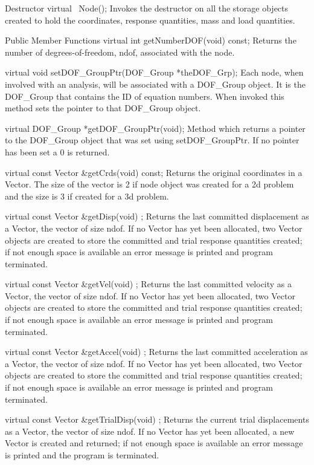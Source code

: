   Destructor  
  virtual ~Node(); 
Invokes the destructor on all the storage objects created to hold the coordinates, 
response quantities, mass and load quantities. 

  Public Member Functions   
  virtual int  getNumberDOF(void) const;
Returns the number of degrees-of-freedom,  ndof, associated with
the node. 

  virtual void setDOF_GroupPtr(DOF_Group *theDOF_Grp); 
Each node, when involved with an analysis, will be associated with a
DOF_Group object. It is the DOF_Group that contains the ID of equation
numbers. When invoked this method sets the pointer to that DOF_Group object. 

 virtual DOF_Group *getDOF_GroupPtr(void); 
Method which returns a pointer to the DOF_Group object that was set
using  setDOF_GroupPtr. If no pointer has been set a 0 is
returned. 

 virtual const Vector &getCrds(void) const;  
Returns the original coordinates in a Vector. The size of the vector
is 2 if node object was created for a 2d problem and the size is 3 if
created for a 3d problem. 

  virtual const Vector &getDisp(void) ;  
Returns the last committed displacement as a Vector, the vector of
size  ndof. If no Vector has yet been allocated, two Vector
objects are created to store the committed and trial response
quantities created; if not enough space is available an error message
is printed and program terminated.  

  virtual const Vector &getVel(void) ;  
Returns the last committed velocity as a Vector, the vector of size
 ndof. If no Vector has yet been allocated, two Vector
objects are created to store the committed and trial response
quantities created; if not enough space is available an error message
is printed and program terminated.  


  virtual const Vector &getAccel(void) ;  
Returns the last committed acceleration as a Vector, the vector of
size  ndof. If no Vector has yet been allocated, two Vector 
objects are created to store the committed and trial response
quantities created; if not enough space is available an error message
is printed and program terminated.  

  virtual const Vector &getTrialDisp(void) ;  
Returns the current trial displacements as a Vector, the vector of size  ndof.
If no Vector has yet been allocated, a new Vector is created and returned;
if not enough space is available an error message is printed and the
program is terminated.  


